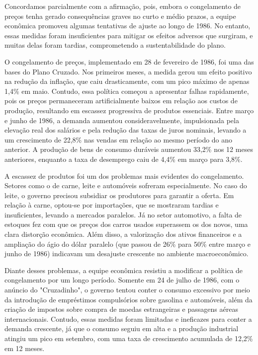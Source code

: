\documentclass[a4paper,12pt]{article}[abntex2]
\begin{document}
Concordamos parcialmente com a afirmação, pois, embora o congelamento de preços tenha gerado consequências graves no curto e médio prazos, a equipe econômica promoveu algumas tentativas de ajuste ao longo de 1986. No entanto, essas medidas foram insuficientes para mitigar os efeitos adversos que surgiram, e muitas delas foram tardias, comprometendo a sustentabilidade do plano.

O congelamento de preços, implementado em 28 de fevereiro de 1986, foi uma das bases do Plano Cruzado. Nos primeiros meses, a medida gerou um efeito positivo na redução da inflação, que caiu drasticamente, com um pico máximo de apenas 1,4\% em maio. Contudo, essa política começou a apresentar falhas rapidamente, pois os preços permaneceram artificialmente baixos em relação aos custos de produção, resultando em escassez progressiva de produtos essenciais. Entre março e junho de 1986, a demanda aumentou consideravelmente, impulsionada pela elevação real dos salários e pela redução das taxas de juros nominais, levando a um crescimento de 22,8\% nas vendas em relação ao mesmo período do ano anterior. A produção de bens de consumo duráveis aumentou 33,2\% nos 12 meses anteriores, enquanto a taxa de desemprego caiu de 4,4\% em março para 3,8\%.

A escassez de produtos foi um dos problemas mais evidentes do congelamento. Setores como o de carne, leite e automóveis sofreram especialmente. No caso do leite, o governo precisou subsidiar os produtores para garantir a oferta. Em relação à carne, optou-se por importações, que se mostraram tardias e insuficientes, levando a mercados paralelos. Já no setor automotivo, a falta de estoques fez com que os preços dos carros usados superassem os dos novos, uma clara distorção econômica. Além disso, a valorização dos ativos financeiros e a ampliação do ágio do dólar paralelo (que passou de 26\% para 50\% entre março e junho de 1986) indicavam um desajuste crescente no ambiente macroeconômico.

Diante desses problemas, a equipe econômica resistiu a modificar a política de congelamento por um longo período. Somente em 24 de julho de 1986, com o anúncio do "Cruzadinho", o governo tentou conter o consumo excessivo por meio da introdução de empréstimos compulsórios sobre gasolina e automóveis, além da criação de impostos sobre compra de moedas estrangeiras e passagens aéreas internacionais. Contudo, essas medidas foram limitadas e ineficazes para conter a demanda crescente, já que o consumo seguiu em alta e a produção industrial atingiu um pico em setembro, com uma taxa de crescimento acumulada de 12,2\% em 12 meses.
\end{document}
